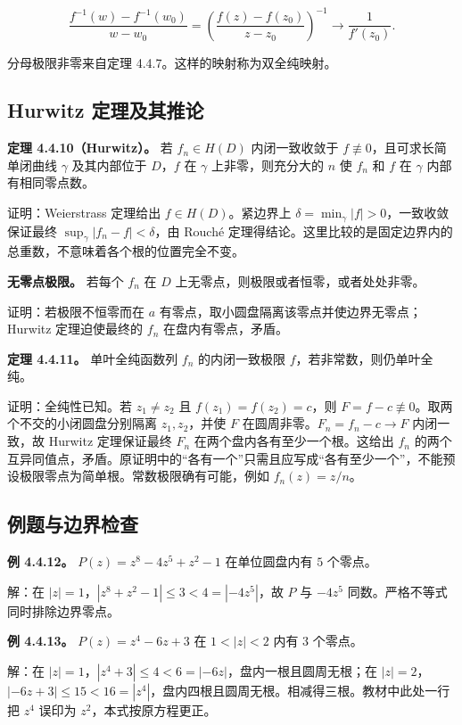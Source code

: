 \documentclass[11pt,a4paper]{article}
\begin{document}
\[
\frac{f^{-1}(w)-f^{-1}(w_0)}{w-w_0}
=\left(\frac{f(z)-f(z_0)}{z-z_0}\right)^{-1}
\longrightarrow\frac1{f'(z_0)}.
\]

分母极限非零来自定理 4.4.7。这样的映射称为双全纯映射。

\subsection{Hurwitz 定理及其推论}\label{ch04-s4-heading-5}

\textbf{定理 4.4.10（Hurwitz）。} 若 \(f_n\in H(D)\) 内闭一致收敛于
\(f\not\equiv0\)，且可求长简单闭曲线 \(\gamma\) 及其内部位于
\(D\)，\(f\) 在 \(\gamma\) 上非零，则充分大的 \(n\) 使 \(f_n\) 和 \(f\)
在 \(\gamma\) 内部有相同零点数。

证明：Weierstrass 定理给出 \(f\in H(D)\)。紧边界上
\(\delta=\min_\gamma|f|>0\)，一致收敛保证最终
\(\sup_\gamma|f_n-f|<\delta\)，由 Rouché
定理得结论。这里比较的是固定边界内的总重数，不意味着各个根的位置完全不变。

\textbf{无零点极限。} 若每个 \(f_n\) 在 \(D\)
上无零点，则极限或者恒零，或者处处非零。

证明：若极限不恒零而在 \(a\)
有零点，取小圆盘隔离该零点并使边界无零点；Hurwitz 定理迫使最终的 \(f_n\)
在盘内有零点，矛盾。

\textbf{定理 4.4.11。} 单叶全纯函数列 \(f_n\) 的内闭一致极限
\(f\)，若非常数，则仍单叶全纯。

证明：全纯性已知。若 \(z_1\ne z_2\) 且 \(f(z_1)=f(z_2)=c\)，则
\(F=f-c\not\equiv0\)。取两个不交的小闭圆盘分别隔离 \(z_1,z_2\)，并使
\(F\) 在圆周非零。\(F_n=f_n-c\to F\) 内闭一致，故 Hurwitz 定理保证最终
\(F_n\) 在两个盘内各有至少一个根。这给出 \(f_n\)
的两个互异同值点，矛盾。原证明中的``各有一个''只需且应写成``各有至少一个''，不能预设极限零点为简单根。常数极限确有可能，例如
\(f_n(z)=z/n\)。

\subsection{例题与边界检查}\label{ch04-s4-heading-6}

\textbf{例 4.4.12。} \(P(z)=z^8-4z^5+z^2-1\) 在单位圆盘内有 \(5\)
个零点。

解：在 \(|z|=1\)，\(|z^8+z^2-1|\le3<4=|-4z^5|\)，故 \(P\) 与 \(-4z^5\)
同数。严格不等式同时排除边界零点。

\textbf{例 4.4.13。} \(P(z)=z^4-6z+3\) 在 \(1<|z|<2\) 内有 \(3\)
个零点。

解：在 \(|z|=1\)，\(|z^4+3|\le4<6=|-6z|\)，盘内一根且圆周无根；在
\(|z|=2\)，\(|-6z+3|\le15<16=|z^4|\)，盘内四根且圆周无根。相减得三根。教材中此处一行把
\(z^4\) 误印为 \(z^2\)，本式按原方程更正。
\end{document}
